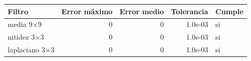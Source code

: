 \begin{tabular}{lrrrl}
\toprule
Filtro & Error máximo & Error medio & Tolerancia & Cumple \\
\midrule
media 9$\times$9 & 0 & 0 & 1.0e-03 & si \\
nitidez 3$\times$3 & 0 & 0 & 1.0e-03 & si \\
laplaciano 3$\times$3 & 0 & 0 & 1.0e-03 & si \\
\bottomrule
\end{tabular}
